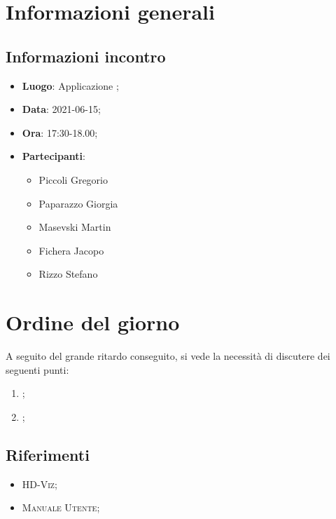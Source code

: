 \documentclass{article}
\begin{document}


\section{Informazioni generali}
\label{sec:info_generali}

\subsection{Informazioni incontro}
\label{sub:info_incontro}

\begin{itemize}
	\item \textbf{Luogo}: Applicazione ;
	\item \textbf{Data}: 2021-06-15;
	\item \textbf{Ora}: 17:30-18.00;
	\item \textbf{Partecipanti}:
	\begin{itemize}
		\item Piccoli Gregorio
		\item Paparazzo Giorgia
		\item Masevski Martin
		\item Fichera Jacopo
		\item Rizzo Stefano

	\end{itemize}
\end{itemize}

\section{Ordine del giorno}%
\label{sec:ordine_del_giorno}
A seguito del grande ritardo conseguito, si vede la necessità di discutere dei seguenti punti:
\begin{enumerate}
	\item {};
	\item {};
\end{enumerate}


\subsection{Riferimenti}%
\label{sub:riferimenti}
\begin{itemize}
    \item \textsc{HD-Viz};
    \item \textsc{Manuale Utente};
    \end{itemize}
\end{document}
